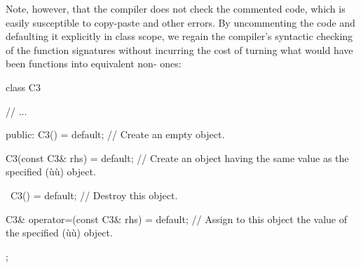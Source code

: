 \noindent Note, however, that the compiler does not check the commented code, which is easily susceptible to copy-paste and other errors. By
uncommenting the code and defaulting it explicitly in class scope, we
regain the compiler's syntactic checking of the function signatures
without incurring the cost of turning what would have been
 functions into equivalent
non- ones:

\begin{emcppslisting}[language=C++]
class C3
{
     // ...

public:
   C3() = default;
       // Create an empty object.

   C3(const C3& rhs) = default;
       // Create an object having the same value as the specified (ù{}ù) object.

   ~C3() = default;
       // Destroy this object.

   C3& operator=(const C3& rhs) = default;
       // Assign to this object the value of the specified (ù{}ù) object.
};
\end{emcppslisting}


